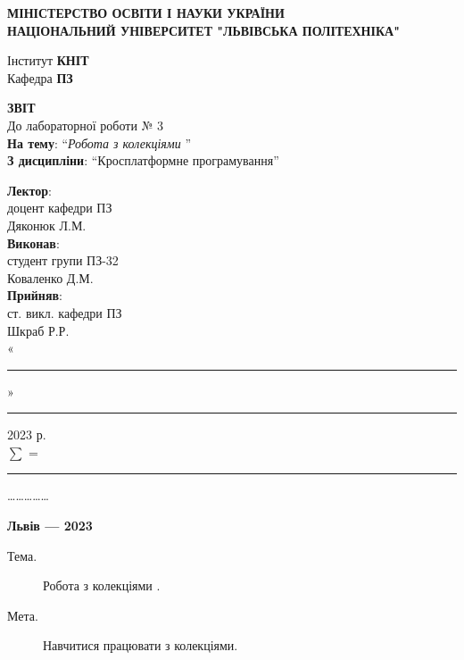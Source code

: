 \documentclass[14pt]{extreport}
\newcommand\subject{Кросплатформне програмування}
\newcommand\lecturer{доцент кафедри ПЗ\\Дяконюк Л.М.}
\newcommand\teacher{ст. викл. кафедри ПЗ\\Шкраб Р.Р.}
\newcommand\mygroup{ПЗ-32}
\newcommand\lab{3}
\newcommand\theme{Робота з колекціями
}
\newcommand\purpose{Навчитися працювати з колекціями}
\begin{document}
\begin{normalsize}
	\begin{titlepage}
		\thispagestyle{empty}
		\begin{center}
			\textbf{МІНІСТЕРСТВО ОСВІТИ І НАУКИ УКРАЇНИ\\
				НАЦІОНАЛЬНИЙ УНІВЕРСИТЕТ "ЛЬВІВСЬКА ПОЛІТЕХНІКА"}
		\end{center}
		\begin{flushright}
			Інститут \textbf{КНІТ}\\
			Кафедра \textbf{ПЗ}
		\end{flushright}
		\vspace{160pt}
		\begin{center}
			\textbf{ЗВІТ}\\
			\vspace{10pt}
			До лабораторної роботи № \lab\\
			\textbf{На тему}: “\textit{\theme}”\\
			\textbf{З дисципліни}: “\subject”
		\end{center}
		\vspace{40pt}
		\begin{flushright}
			
			\textbf{Лектор}:\\
			\lecturer\\
			\vspace{10pt}
			\textbf{Виконав}:\\
			
			студент групи \mygroup\\
			Коваленко Д.М.\\
			\vspace{10pt}
			\textbf{Прийняв}:\\
			
			\teacher\\
			
			\vspace{28pt}
			«\rule{1cm}{0.15mm}» \rule{1.5cm}{0.15mm} 2023 р.\\
			$\sum$ = \rule{1cm}{0.15mm}……………\\
			
		\end{flushright}
		\vspace{\fill}
		\begin{center}
			\textbf{Львів — 2023}
		\end{center}
	\end{titlepage}
		
	\begin{description}
		\item[Тема.] \theme.
		\item[Мета.] \purpose.
	\end{description}
	


\end{normalsize}
\end{document}
